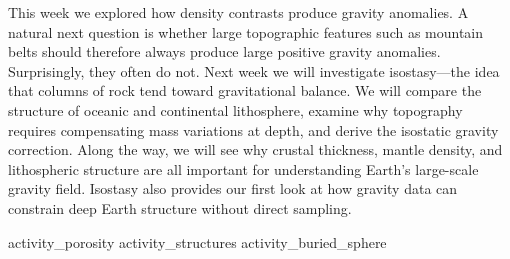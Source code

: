 This week we explored how density contrasts produce gravity anomalies. A natural next question is whether large topographic features such as mountain belts should therefore always produce large positive gravity anomalies. Surprisingly, they often do not. Next week we will investigate isostasy---the idea that columns of rock tend toward gravitational balance. We will compare the structure of oceanic and continental lithosphere, examine why topography requires compensating mass variations at depth, and derive the isostatic gravity correction. Along the way, we will see why crustal thickness, mantle density, and lithospheric structure are all important for understanding Earth's large-scale gravity field. Isostasy also provides our first look at how gravity data can constrain deep Earth structure without direct sampling.

\workshopend
\notepage
\notepage

{activity_porosity}
{activity_structures}
{activity_buried_sphere}